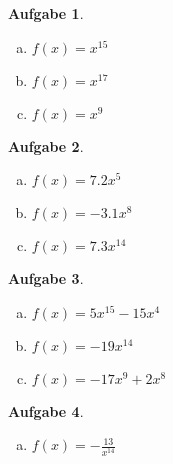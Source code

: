 \documentclass[12pt]{article}
\theoremstyle{note}
\newtheorem{aufgabe}{Aufgabe}
\begin{document}
\begin{flushleft}
\begin{aufgabe} ~ \ 
\begin{multicols}{3} 
\begin{enumerate}[a)] 
\item $f(x)=$$x^{15}$\\

\item $f(x)=$$x^{17}$\\

\item $f(x)=$$x^{9}$\\

\end{enumerate} 
\end{multicols} 
\end{aufgabe}\vspace{1em}\begin{aufgabe} ~ \ 
\begin{multicols}{3} 
\begin{enumerate}[a)] 
\item $f(x)=$$7.2 x^{5}$\\

\item $f(x)=$$- 3.1 x^{8}$\\

\item $f(x)=$$7.3 x^{14}$\\

\end{enumerate} 
\end{multicols} 
\end{aufgabe}\vspace{1em}\begin{aufgabe} ~ \ 
\begin{multicols}{3} 
\begin{enumerate}[a)] 
\item $f(x)=$$5 x^{15} - 15 x^{4}$\\

\item $f(x)=$$- 19 x^{14}$\\

\item $f(x)=$$- 17 x^{9} + 2 x^{8}$\\

\end{enumerate} 
\end{multicols} 
\end{aufgabe}\vspace{1em}\begin{aufgabe} ~ \ 
\begin{multicols}{3} 
\begin{enumerate}[a)] 
\item $f(x)=$$- \frac{13}{x^{14}}$\\


\end{enumerate}
\end{multicols}
\end{aufgabe}
\end{flushleft}
\end{document}
